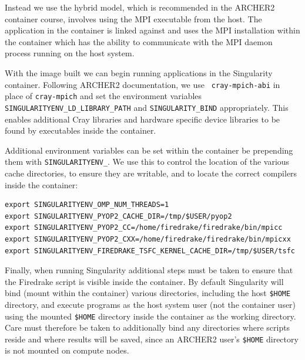 \documentclass[a4paper,11pt]{article}
\begin{document}
Instead we use the hybrid model, which is recommended in the ARCHER2 container course, involves using the MPI executable from the host.
The application in the container is linked against and uses the MPI installation within the container which has the ability to communicate with the MPI daemon process running on the host system.

With the image built we can begin running applications in the Singularity container.
Following ARCHER2 documentation\cite{archer2docs}, we use \verb` cray-mpich-abi` in place of \verb`cray-mpich` and set the environment variables \verb`SINGULARITYENV_LD_LIBRARY_PATH` and \verb`SINGULARITY_BIND` appropriately.
This enables additional Cray libraries and hardware specific device libraries to be found by executables inside the container.

Additional environment variables can be set within the container be prepending them with \verb`SINGULARITYENV_`.
We use this to control the location of the various cache directories, to ensure they are writable, and to locate the correct compilers inside the container:
\begin{lstlisting}
export SINGULARITYENV_OMP_NUM_THREADS=1
export SINGULARITYENV_PYOP2_CACHE_DIR=/tmp/$USER/pyop2
export SINGULARITYENV_PYOP2_CC=/home/firedrake/firedrake/bin/mpicc
export SINGULARITYENV_PYOP2_CXX=/home/firedrake/firedrake/bin/mpicxx
export SINGULARITYENV_FIREDRAKE_TSFC_KERNEL_CACHE_DIR=/tmp/$USER/tsfc
\end{lstlisting}

Finally, when running Singularity additional steps must be taken to ensure that the Firedrake script is visible inside the container.
By default Singularity will bind (mount within the container) various directories, including the host \verb`$HOME` directory, and execute programs as the host system user (not the container user) using the mounted \verb`$HOME` directory inside the container as the working  directory.
Care must therefore be taken to additionally bind any directories where scripts reside and where results will be saved, since an ARCHER2 user's \verb`$HOME` directory is not mounted on compute nodes.
\end{document}
